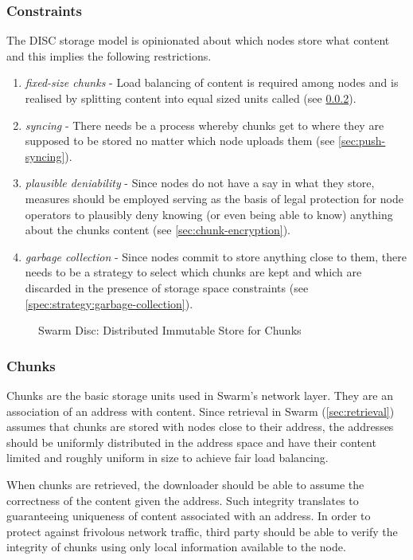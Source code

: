 \subsubsection{Constraints}
The DISC storage model is opinionated about which nodes store what content and this implies the following restrictions. 

\begin{enumerate}
    \item \emph{fixed-size chunks} - Load balancing of content is required among nodes and is realised by splitting content into equal sized units called   (see \ref{sec:chunks}).
    \item \emph{syncing} - There needs be a process whereby chunks get to where they are supposed to be stored no matter which node uploads them (see \ref{sec:push-syncing}).
    \item \emph{plausible deniability} - Since nodes do not have a say in what they store, measures should be employed serving as the basis of legal protection for node operators to plausibly deny knowing (or even being able to know) anything about the chunks content (see \ref{sec:chunk-encryption}).
    \item \emph{garbage collection} - Since nodes commit to store anything close to them, there needs to be a strategy to select which chunks are kept and which are discarded in the presence of storage space constraints (see  \ref{spec:strategy:garbage-collection}). 
\end{enumerate}


\begin{figure}[htbp]
   \centering
   \caption[Swarm Disc:  Distributed Immutable Store for Chunks]{Swarm Disc:  Distributed Immutable Store for Chunks}
   \label{fig:disc}
\end{figure}

\subsubsection{Chunks}\label{sec:chunks}

Chunks are the basic storage units used in Swarm's network layer. They are an association of an address with content. Since retrieval in Swarm (\ref{sec:retrieval}) assumes that chunks are stored with nodes close to their address,  the addresses should be uniformly distributed in the address space and have their content limited and roughly uniform in size to achieve fair load balancing.  

When  chunks are retrieved, the downloader should be able to assume the correctness of the content given the address. Such integrity translates to guaranteeing uniqueness of content associated with an address. In order to protect against frivolous network traffic, third party  should be able to verify the integrity of chunks using only local information available to the node.

